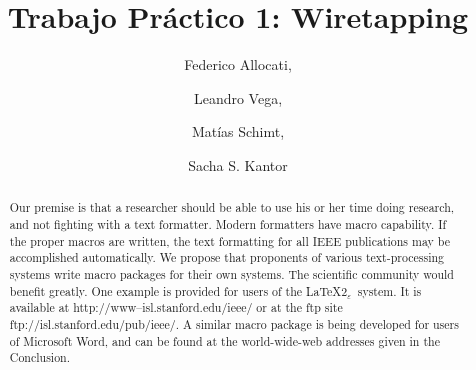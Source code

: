\documentclass[%
	final,
	notitlepage,
	narroweqnarray,
	inline,
	twoside,
	]{ieee}
\newcommand{\latexiie}{\LaTeX2{\Large$_\varepsilon$}}
\begin{document}
\title[Trabajo Pr\'actico 1: Wiretapping]{%
       Trabajo Pr\'actico 1: Wiretapping}

\author[ALLOCATI, VEGA, SCHMIT AND KANTOR]{%
    Federico Allocati,
    \and{} Leandro Vega,
    \and{} Mat\'ias Schimt,
    \and{} Sacha S. Kantor
}




\maketitle

\begin{abstract} 
Our premise is that a researcher should be able to use his or her time
doing research, and not fighting with a text formatter. Modern
formatters have macro capability. If the proper macros are written,
the text formatting for all IEEE publications may be accomplished
automatically.  We propose that proponents of various text-processing
systems write macro packages for their own systems.  The scientific
community would benefit greatly.  One example is provided for users of
the \latexiie\ system. It is available at
\mbox{http://www--isl.stanford.edu/ieee/} or at the ftp site
\mbox{ftp://isl.stanford.edu/pub/ieee/}. A sim\-i\-lar macro package
is being developed for users of Microsoft Word, and can be found at
the world-wide-web addresses given in the Conclusion.
\end{abstract}
\end{document}
